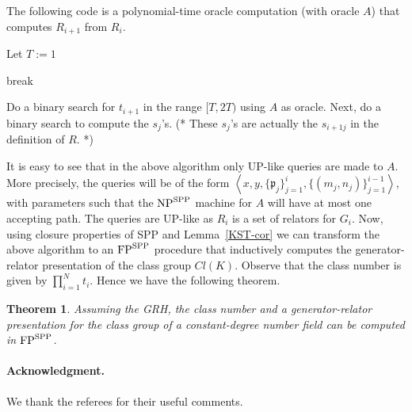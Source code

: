 \documentclass{article}
\newcommand{\FP}{{\rm FP}}
\newcommand{\NP}{{\rm NP}}
\newcommand{\SPP}{{\rm SPP}}
\newtheorem{theorem}{Theorem}[section]
\theoremstyle{definition}\newtheorem{remark}[theorem]{Remark}
\begin{document}
The following code is a polynomial-time oracle computation (with
oracle $A$) that computes $R_{i+1}$ from $R_i$.

\begin{algorithm}
\vspace{-5mm}
  Let $T := 1$\;
  \While{ \KwTrue }
  {
    
    { break }
  }
 Do a binary search for $t_{i+1}$ in the range $[T,2T)$ using $A$ as oracle.\;
Next, do a binary search to compute the $s_j$'s.
(* These $s_j$'s are actually the $s_{i+1j}$ in the definition of $R$. *)
\vspace{-5mm}
\end{algorithm}
It is easy to see that in the above algorithm only UP-like queries
are made to $A$. More precisely, the queries will be of the
form $\left\langle
  x,y,\{\mathfrak{p}_j\}_{j=1}^i,\{(m_j,n_j)\}_{j=1}^{i-1}\right\rangle$,
with parameters such that the $\NP^{\SPP}$ machine for $A$ will have
at most one accepting path. The queries are UP-like as $R_i$ is a set
of relators for $G_i$. Now, using closure properties of SPP and
Lemma~\ref{KST-cor} we can transform the above algorithm to an
$\FP^\SPP$ procedure that inductively computes the generator-relator
presentation of the class group $Cl(K)$. Observe that the class number
is given by $\prod_{i=1}^N t_i$. Hence we have the following theorem.

\begin{theorem}
  Assuming the GRH, the class number and a generator-relator
  presentation for the class group of a constant-degree number field
  can be computed in $\FP^{\SPP}$.
\end{theorem}

\paragraph{Acknowledgment.} We thank the referees for their useful comments.
\end{document}
